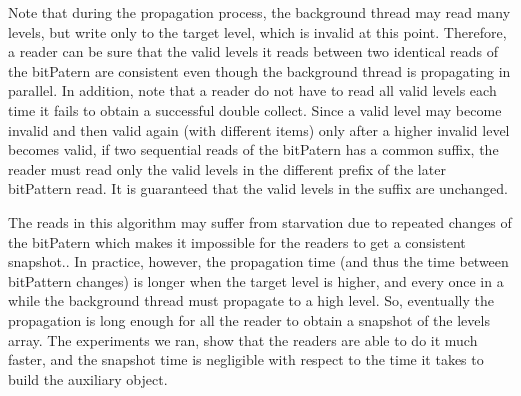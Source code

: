 Note that during the propagation process, the background
thread may read many levels, but write only to the target level,
which is invalid at this point.
Therefore, a reader can be sure that the valid levels it reads
between two identical reads of the bitPatern are consistent
even though the background thread is
propagating in parallel.
In addition, note that a reader do not have to read all valid
levels each time it fails to obtain a successful double collect.
Since a valid level may become invalid and then valid again
(with different items) only after a higher invalid level becomes
valid, if two sequential reads of the bitPatern has a
common suffix, the reader must read only the valid levels in
the different prefix of the later bitPattern read. 
It is guaranteed that the valid levels in the suffix are
unchanged.

The reads in this algorithm may suffer from starvation due to repeated changes of the bitPatern which makes it impossible for the readers to get a consistent snapshot..
In practice, however, the propagation time (and thus
the time between bitPattern changes) is longer when the target
level is higher, and every once in a while the background thread must
propagate to a high level.
So, eventually the propagation is long enough for
all the reader to obtain a snapshot of the levels array. 
The experiments we ran, show that the readers are able to do it
much faster, and the snapshot time is negligible with respect to the time it takes to
build the auxiliary object.

